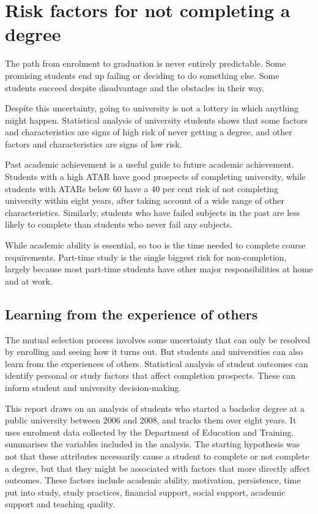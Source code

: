 \chapter{Risk factors for not completing a degree} \label{chap:3}

The path from enrolment to graduation is never entirely predictable. Some promising students end up failing or deciding to do something else. Some students succeed despite disadvantage and the obstacles in their way.

Despite this uncertainty, going to university is not a lottery in which anything might happen. Statistical analysis of university students shows that some factors and characteristics are signs of high risk of never getting a degree, and other factors and characteristics are signs of low risk.

Past academic achievement is a useful guide to future academic achievement. Students with a high ATAR have good prospects of completing university, while students with ATARs below 60 have a 40 per cent risk of not completing university within eight years, after taking account of a wide range of other characteristics. Similarly, students who have failed subjects in the past are less likely to complete than students who never fail any subjects.

While academic ability is essential, so too is the time needed to complete course requirements. Part-time study is the single biggest risk for non-completion, largely because most part-time students have other major responsibilities at home and at work.

\section{Learning from the experience of others}\label{sec:3.1}

The mutual selection process involves some uncertainty that can only be resolved by enrolling and seeing how it turns out. But students and universities can also learn from the experiences of others. Statistical analysis of student outcomes can identify personal or study factors that affect completion prospects. These can inform student and university decision-making.

This report draws on an analysis of students who started a bachelor degree at a public university between 2006 and 2008, and tracks them over eight years. It uses enrolment data collected by the Department of Education and Training.  summarises the variables included in the analysis. The starting hypothesis was not that these attributes necessarily cause a student to complete or not complete a degree, but that they might be associated with factors that more directly affect outcomes. These factors include academic ability, motivation, persistence, time put into study, study practices, financial support, social support, academic support and teaching quality.

